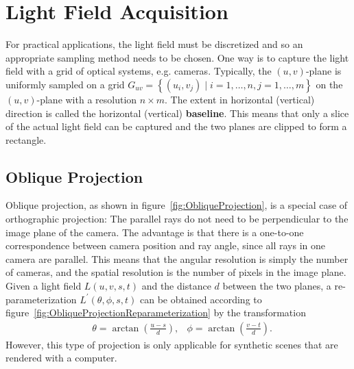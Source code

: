 \section{Light Field Acquisition}

For practical applications, the light field must be discretized and so an appropriate sampling method needs to be chosen.
One way is to capture the light field with a grid of optical systems, e.g. cameras.
Typically, the $(u, v)$-plane is uniformly sampled on a grid $G_{uv} = \left \{ \left( u_i, v_j \right) \mid i = 1,\dots, n, j = 1, \dots, m\right \}$ on the $(u, v)$-plane with a resolution $n \times m$.
The extent in horizontal (vertical) direction is called the horizontal (vertical) \textbf{baseline}.
This means that only a slice of the actual light field can be captured and the two planes are clipped to form a rectangle.



\subsection*{Oblique Projection}

Oblique projection, as shown in figure~\ref{fig:ObliqueProjection}, is a special case of orthographic projection: The parallel rays do not need to be perpendicular to the image plane of the camera.
The advantage is that there is a one-to-one correspondence between camera position and ray angle, since all rays in one camera are parallel.
This means that the angular resolution is simply the number of cameras, and the spatial resolution is the number of pixels in the image plane.
Given a light field $L(u, v, s, t)$ and the distance $d$ between the two planes, a re-parameterization $L^{\prime}(\theta, \phi, s, t)$ can be obtained according to figure~\ref{fig:ObliqueProjectionReparameterization} by the transformation
\begin{align*}
		& \theta = \arctan\left(\frac{u - s}{d}\right), & \phi = \arctan\left(\frac{v - t}{d}\right).
\end{align*}
However, this type of projection is only applicable for synthetic scenes that are rendered with a computer.


